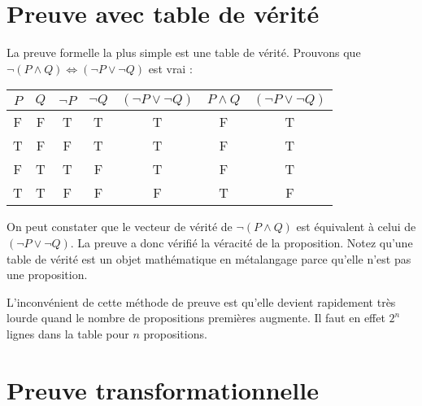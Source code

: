 		\section{Preuve avec table de vérité}
La preuve formelle la plus simple est une table de vérité.
		Prouvons que $\lnot (P \land Q) \Leftrightarrow (\lnot P \lor \lnot Q)$ est vrai :
			\begin{center}
			\begin{tabular}{cc|ccxcx}
			$P$ & $Q$ & $\lnot P$ & $\lnot Q$ & $(\lnot P \lor \lnot Q)$ & $P \land Q$ & $ (\lnot P \lor \lnot Q)$\\
			\hline
			F&F&T&T&T&F&T\\
			T&F&F&T&T&F&T\\
			F&T&T&F&T&F&T\\
			T&T&F&F&F&T&F\\
			\end{tabular}
			\end{center}

On peut constater que le vecteur de vérité de $\lnot (P \land Q)$ est équivalent à celui de $(\lnot P \lor  \lnot Q)$. La preuve a donc vérifié la véracité de la proposition.
Notez qu'une table de vérité est un objet mathématique en métalangage
parce qu'elle n'est pas une proposition.

L'inconvénient de cette méthode de preuve est qu'elle devient rapidement très lourde quand le nombre de propositions premières augmente. Il faut en effet $2^n$ lignes dans la table pour $n$ propositions. 

\section{Preuve transformationnelle}

